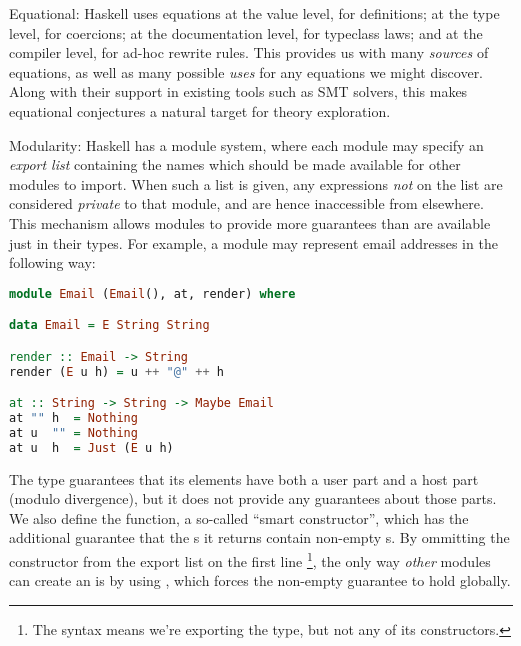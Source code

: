 \begin{description}
\item{Equational}: Haskell uses equations at the value level, for definitions;
  at the type level, for coercions; at the documentation level, for typeclass
  laws; and at the compiler level, for ad-hoc rewrite rules. This provides us
  with many \emph{sources} of equations, as well as many possible \emph{uses}
  for any equations we might discover. Along with their support in existing
  tools such as SMT solvers, this makes equational conjectures a natural target
  for theory exploration.

\item{Modularity}: Haskell has a module system, where each module may specify an
  \emph{export list} containing the names which should be made available for
  other modules to import. When such a list is given, any expressions \emph{not}
  on the list are considered \emph{private} to that module, and are hence
  inaccessible from elsewhere. This mechanism allows modules to provide more
  guarantees than are available just in their types. For example, a module may
  represent email addresses in the following way:

\begin{lstlisting}[language=Haskell, xleftmargin=.2\textwidth, xrightmargin=.2\textwidth, upquote=true]
module Email (Email(), at, render) where

data Email = E String String

render :: Email -> String
render (E u h) = u ++ "@" ++ h

at :: String -> String -> Maybe Email
at "" h  = Nothing
at u  "" = Nothing
at u  h  = Just (E u h)
\end{lstlisting}

The  type guarantees that its elements have both a user part and a
host part (modulo divergence), but it does not provide any guarantees about
those parts. We also define the  function, a so-called ``smart
constructor'', which has the additional guarantee that the s it
returns contain non-empty s. By ommitting the  constructor from
the export list on the first line \footnote{The syntax  means we're
  exporting the  type, but not any of its constructors.}, the only way
\emph{other} modules can create an  is by using , which forces
the non-empty guarantee to hold globally.

\end{description}

